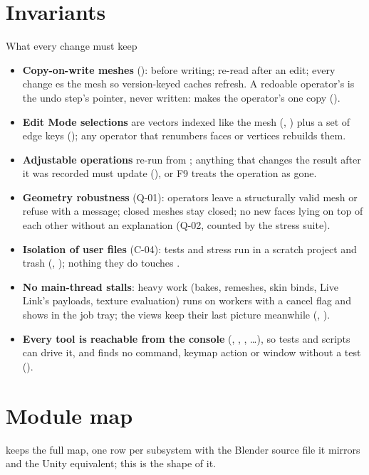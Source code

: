 \section{Invariants}
\begin{rulebox}{What every change must keep}
\begin{itemize}
  \item \textbf{Copy-on-write meshes} ():  before writing; re-read 
    after an edit; every change es the mesh so version-keyed caches refresh. A redoable operator's
     is the undo step's pointer, never written:  makes the operator's one copy
    ().
  \item \textbf{Edit Mode selections} are vectors indexed like the mesh (, ) plus a set
    of edge keys (); any operator that renumbers faces or vertices rebuilds them.
  \item \textbf{Adjustable operations} re-run from ; anything that changes the result after it was recorded
    must update  (), or F9 treats the operation as gone.
  \item \textbf{Geometry robustness} (Q-01): operators leave a structurally valid mesh or refuse with a message; closed
    meshes stay closed; no new faces lying on top of each other without an explanation (Q-02, counted by the stress suite).
  \item \textbf{Isolation of user files} (C-04): tests and stress run in a scratch project and trash
    (, ); nothing they do touches .
  \item \textbf{No main-thread stalls}: heavy work (bakes, remeshes, skin binds, Live Link's payloads, texture
    evaluation) runs on workers with a cancel flag and shows in the job tray; the views keep their last picture
    meanwhile (, ).
  \item \textbf{Every tool is reachable from the console} (, , , \ldots),
    so tests and scripts can drive it, and  finds no command, keymap action or
    window without a test ().
\end{itemize}
\end{rulebox}

\section{Module map}
 keeps the full map, one row per subsystem with the Blender source file it mirrors and the
Unity equivalent; this is the shape of it.

